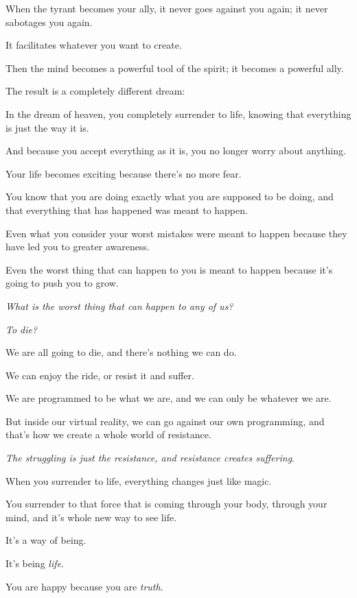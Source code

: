 \documentclass{article}
\numberwithin{equation}{section}
\begin{document}
When the tyrant becomes your ally, it never goes against you again; it never sabotages you again.

It facilitates whatever you want to create.

Then the mind becomes a powerful tool of the spirit; it becomes a powerful ally.

The result is a completely different dream: 

%
In the dream of heaven, you completely surrender to life, knowing that everything is just the way it is.

And because you accept everything as it is, you no longer worry about anything.

Your life becomes exciting because there's no more fear.

You know that you are doing exactly what you are supposed to be doing, and that everything that has happened was meant to happen.

Even what you consider your worst mistakes were meant to happen because they have led you to greater awareness.

Even the worst thing that can happen to you is meant to happen because it's going to push you to grow.

%
\textit{What is the worst thing that can happen to any of us?}

\textit{To die?}

We are all going to die, and there's nothing we can do.

We can enjoy the ride, or resist it and suffer.


We are programmed to be what we are, and we can only be whatever we are.

But inside our virtual reality, we can go against our own programming, and that's how we create a whole world of resistance.

\textit{The struggling is just the resistance, and resistance creates suffering}.

%
When you surrender to life, everything changes just like magic.

You surrender to that force that is coming through your body, through your mind, and it's whole new way to see life.

It's a way of being.

It's being \textit{life}.

You are happy because you are \textit{truth}.
\end{document}
